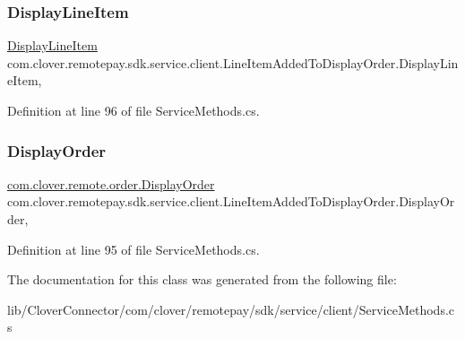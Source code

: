 \subsubsection{\texorpdfstring{Display\+Line\+Item}{DisplayLineItem}}
{\footnotesize\ttfamily \hyperlink{classcom_1_1clover_1_1remote_1_1order_1_1_display_line_item}{Display\+Line\+Item} com.\+clover.\+remotepay.\+sdk.\+service.\+client.\+Line\+Item\+Added\+To\+Display\+Order.\+Display\+Line\+Item\hspace{0.3cm}{\ttfamily [get]}, {\ttfamily [set]}}



Definition at line 96 of file Service\+Methods.\+cs.

\mbox{\label{classcom_1_1clover_1_1remotepay_1_1sdk_1_1service_1_1client_1_1_line_item_added_to_display_order_aa5e0f11e299ffcd42693a4b5c831a919}} 
\subsubsection{\texorpdfstring{Display\+Order}{DisplayOrder}}
{\footnotesize\ttfamily \hyperlink{classcom_1_1clover_1_1remote_1_1order_1_1_display_order}{com.\+clover.\+remote.\+order.\+Display\+Order} com.\+clover.\+remotepay.\+sdk.\+service.\+client.\+Line\+Item\+Added\+To\+Display\+Order.\+Display\+Order\hspace{0.3cm}{\ttfamily [get]}, {\ttfamily [set]}}



Definition at line 95 of file Service\+Methods.\+cs.



The documentation for this class was generated from the following file\+:\begin{DoxyCompactItemize}
\item 
lib/\+Clover\+Connector/com/clover/remotepay/sdk/service/client/Service\+Methods.\+cs\end{DoxyCompactItemize}
